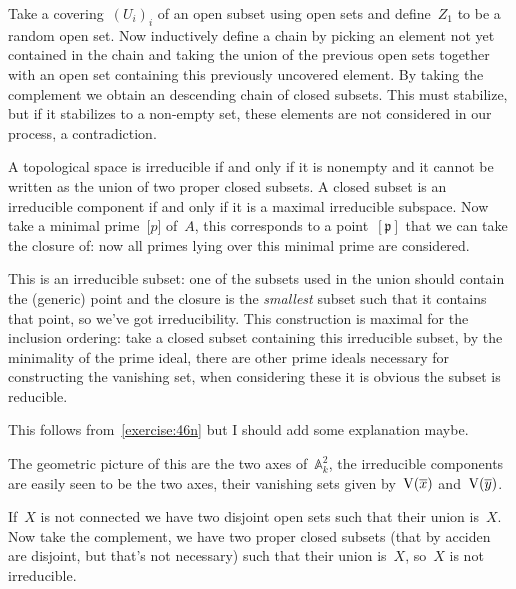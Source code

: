 \begin{exercise}
  Take a covering~$(U_i)_i$ of an open subset using open sets and define~$Z_1$ to be a random open set. Now inductively define a chain by picking an element not yet contained in the chain and taking the union of the previous open sets together with an open set containing this previously uncovered element. By taking the complement we obtain an descending chain of closed subsets. This must stabilize, but if it stabilizes to a non-empty set, these elements are not considered in our process, a contradiction.
\end{exercise}

\begin{exercise} %
  \label{exercise:46n}
  A topological space is irreducible if and only if it is nonempty and it cannot be written as the union of two proper closed subsets. A closed subset is an irreducible component if and only if it is a maximal irreducible subspace. Now take a minimal prime~$\mathfrak[p]$ of~$A$, this corresponds to a point~$[\mathfrak{p}]$ that we can take the closure of: now all primes lying over this minimal prime are considered.

  This is an irreducible subset: one of the subsets used in the union should contain the (generic) point and the closure is the \emph{smallest} subset such that it contains that point, so we've got irreducibility. This construction is maximal for the inclusion ordering: take a closed subset containing this irreducible subset, by the minimality of the prime ideal, there are other prime ideals necessary for constructing the vanishing set, when considering these it is obvious the subset is reducible.
\end{exercise}

\begin{exercise} %
  This follows from~\autoref{exercise:46n} but I should add some explanation maybe.
\end{exercise}

\begin{exercise}
  \label{exercise:46p}
  The geometric picture of this are the two axes of~$\mathbb{A}_k^2$, the irreducible components are easily seen to be the two axes, their vanishing sets given by~$\operatorname{V}(\overline{x})$ and~$\operatorname{V}(\overline{y})$.
\end{exercise}

\begin{exercise}
  If~$X$ is not connected we have two disjoint open sets such that their union is~$X$. Now take the complement, we have two proper closed subsets (that by acciden are disjoint, but that's not necessary) such that their union is~$X$, so~$X$ is not irreducible.
\end{exercise}

